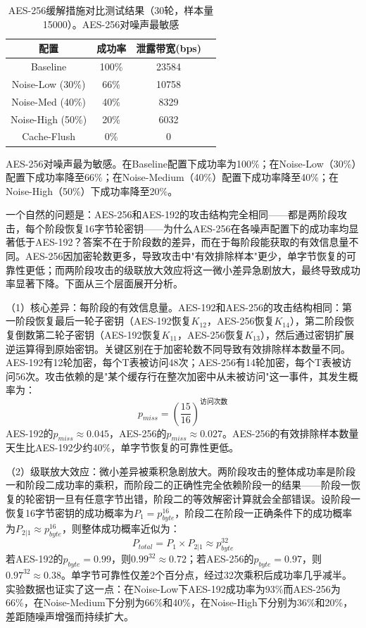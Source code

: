 \begin{table}[htbp]
    \centering
    \caption{AES-256缓解措施对比测试结果（30轮，样本量15000）。AES-256对噪声最敏感}
    \label{tab:aes256_mitigation}
    \begin{tabular}{cccc}
        \toprule
        配置 & 成功率 & 泄露带宽(bps) \\
        \midrule
        Baseline & 100\% & 23584 \\
        Noise-Low (30\%) & 66\% & 10758 \\
        Noise-Med (40\%) & 40\% & 8329 \\
        Noise-High (50\%) & 20\% & 6032 \\
        Cache-Flush & 0\% & 0 \\
        \bottomrule
    \end{tabular}
\end{table}

AES-256对噪声最为敏感。在Baseline配置下成功率为100\%；在Noise-Low（30\%）配置下成功率降至66\%；在Noise-Medium（40\%）配置下成功率降至40\%；在Noise-High（50\%）下成功率降至20\%。

一个自然的问题是：AES-256和AES-192的攻击结构完全相同——都是两阶段攻击，每个阶段恢复16字节轮密钥——为什么AES-256在各噪声配置下的成功率均显著低于AES-192？答案不在于阶段数的差异，而在于每阶段能获取的有效信息量不同。AES-256因加密轮数更多，导致攻击中"有效排除样本"更少，单字节恢复的可靠性更低；而两阶段攻击的级联放大效应将这一微小差异急剧放大，最终导致成功率显著下降。下面从三个层面展开分析。

（1）核心差异：每阶段的有效信息量。AES-192和AES-256的攻击结构相同：第一阶段恢复最后一轮子密钥（AES-192恢复$K_{12}$，AES-256恢复$K_{14}$），第二阶段恢复倒数第二轮子密钥（AES-192恢复$K_{11}$，AES-256恢复$K_{13}$），然后通过密钥扩展逆运算得到原始密钥。关键区别在于加密轮数不同导致有效排除样本数量不同。AES-192有12轮加密，每个T表被访问48次；AES-256有14轮加密，每个T表被访问56次。攻击依赖的是"某个缓存行在整次加密中从未被访问"这一事件，其发生概率为：
\begin{equation}
p_{miss} = \left(\frac{15}{16}\right)^{\text{访问次数}}
\end{equation}
AES-192的$p_{miss} \approx 0.045$，AES-256的$p_{miss} \approx 0.027$。AES-256的有效排除样本数量天生比AES-192少约40\%，单字节恢复的可靠性更低。

（2）级联放大效应：微小差异被乘积急剧放大。两阶段攻击的整体成功率是阶段一和阶段二成功率的乘积，而阶段二的正确性完全依赖阶段一的结果——阶段一恢复的轮密钥一旦有任意字节出错，阶段二的等效解密计算就会全部错误。设阶段一恢复16字节密钥的成功概率为$P_1 = p_{byte}^{16}$，阶段二在阶段一正确条件下的成功概率为$P_{2|1} \approx p_{byte}^{16}$，则整体成功概率近似为：
\begin{equation}
P_{total} = P_1 \times P_{2|1} \approx p_{byte}^{32}
\end{equation}
若AES-192的$p_{byte} = 0.99$，则$0.99^{32} \approx 0.72$；若AES-256的$p_{byte} = 0.97$，则$0.97^{32} \approx 0.38$。单字节可靠性仅差2个百分点，经过32次乘积后成功率几乎减半。实验数据也证实了这一点：在Noise-Low下AES-192成功率为93\%而AES-256为66\%，在Noise-Medium下分别为66\%和40\%，在Noise-High下分别为36\%和20\%，差距随噪声增强而持续扩大。

